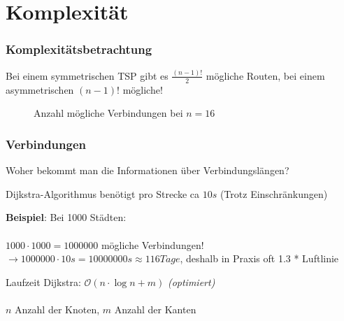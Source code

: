 \documentclass{beamer}
\begin{document}
  \section{Komplexität}
  \begin{frame}
    \frametitle{Komplexitätsbetrachtung}
    Bei einem symmetrischen TSP gibt es $\frac{(n-1)!}{2}$ mögliche Routen,
    bei einem asymmetrischen $(n-1)!$ mögliche!

    \newcount\mycount

    \begin{figure}
      \centering
      \caption{Anzahl mögliche Verbindungen bei $n=16$}
    \end{figure}
  \end{frame}

  \begin{frame}
    \frametitle{Verbindungen}

    Woher bekommt man die Informationen über Verbindungslängen?
    \pause
    \vspace{2em}

    Dijkstra-Algorithmus benötigt pro Strecke ca $10s$ (Trotz Einschränkungen)

    \pause
    \vspace{1em}

    \textbf{Beispiel}: Bei 1000 Städten: \\~\\
    $1000 \cdot 1000 = 1 000 000$ mögliche Verbindungen!
    $\rightarrow 1 000 000 \cdot 10s = 10 000 000s \approx 116 Tage$,
    deshalb in Praxis oft 1.3 * Luftlinie

    \vspace{1em}
    Laufzeit Dijkstra: $\mathcal O(n \cdot \log n + m)$ \textit{(optimiert)}
    \\~\\
    $n$ Anzahl der Knoten, $m$ Anzahl der Kanten
  \end{frame}
\end{document}
